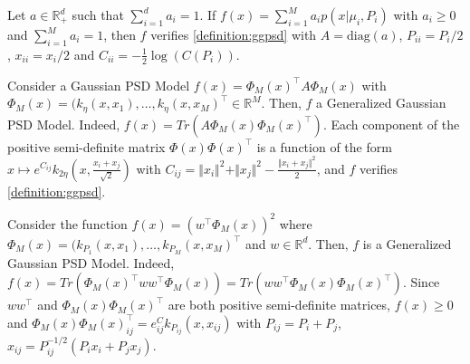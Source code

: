 \begin{example}
Let $a\in\mathbb R^d_+$ such that $\sum_{i=1}^d a_i=1$. If $f(x) = \sum_{i=1}^M a_i p(x | \mu_i, P_i)$ with $a_i \geq 0$ and $\sum_{i=1}^Ma_i = 1$, then $f$ verifies \cref{definition:ggpsd} with $A=\text{diag}(a)$, $P_{ii} = P_i/2$, $x_{ii}=x_i/2$ and $C_{ii} = - \frac{1}{2}\log(C(P_i))$.
\end{example}

\begin{example}
Consider a Gaussian PSD Model $f(x) = \Phi_M(x)^\top  A \Phi_M(x)$ with $\Phi_M(x) = (k_\eta(x, x_1), \ldots, k_\eta(x, x_M)^\top\in\mathbb R^M$. Then, $f$ a Generalized Gaussian PSD Model. Indeed,
$f(x) = Tr(A \Phi_M(x) \Phi_M(x)^\top )$.
Each component of the positive semi-definite matrix $\Phi(x)\Phi(x)^\top $ is a function of the form $x \mapsto e^{C_{ij}}k_{2\eta}(x, \frac{x_i + x_j}{\sqrt{2}})$ with $C_{ij}=\Vert x_i\Vert^2 + \Vert x_j \Vert^2 -\frac{\Vert x_i + x_j\Vert^2}{2}$, and $f$ verifies \cref{definition:ggpsd}.
\end{example}
\begin{example}
Consider the function $f(x) = \left( w^\top \Phi_M(x)\right)^2$ where $\Phi_M(x) = (k_{P_1}(x, x_1), \ldots, k_{P_M}(x, x_M)^\top $ and $w\in\mathbb R^d$. Then, $f$ is a Generalized Gaussian PSD Model. Indeed, $f(x) = Tr\left(\Phi_M(x)^\top ww^\top \Phi_M(x)\right)=Tr\left(ww^\top  \Phi_M(x)\Phi_M(x)^\top \right)$. Since $ww^\top $ and $\Phi_M(x)\Phi_M(x)^\top $ are both positive semi-definite matrices, $f(x)\geq 0$ and $\Phi_M(x)\Phi_M(x)^\top _{ij}=e^C_{ij}k_{P_{ij}}(x, x_{ij})$ with $P_{ij} = P_i + P_j$, $x_{ij} = P_{ij}^{-1/2}\left(P_ix_i + P_jx_j\right)$.
\end{example}


